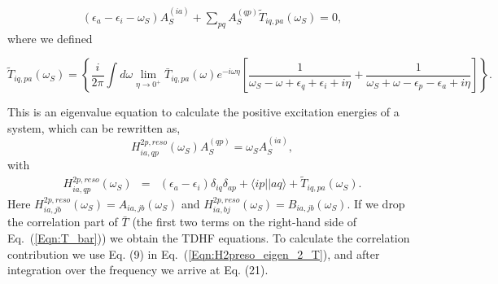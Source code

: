 \documentclass[a4paper,superscriptaddress,twocolumn,aps,prb,floatfix,citeautoscript]{revtex4-1}\usepackage[utf8]{inputenc}
\newcommand{\be}{\begin{equation}}
\newcommand{\ee}{\end{equation}}
\begin{document}
 \begin{eqnarray}
(\epsilon_a-\epsilon_i-\omega_S)A_S^{(ia)}+\sum_{pq}A_S^{(q p)}\widetilde{T}_{iq,pa}(\omega_S)=0,
  \end{eqnarray}
where we defined
\begin{widetext}
\be
\widetilde{T}_{iq,pa}(\omega_S)=\left\{\frac{i}{2\pi}\int d\omega \lim_{\eta\rightarrow 0^+}\bar{T}_{iq,pa}(\omega)e^{-i\omega\eta} \left[\frac{1}{\omega_S-\omega+\epsilon_{q}+\epsilon_i+i\eta}+\frac{1}{\omega_S+\omega-\epsilon_p-\epsilon_a+i\eta}\right]\right\}\nonumber.
 \label{Eqn:H2preso_eigen_2_T}
\ee
\end{widetext}

This is an eigenvalue equation to calculate the positive excitation energies of a system, which can be rewritten as,
  \begin{equation}
 H^{2p,reso}_{ia,qp}(\omega_S)A_S^{(qp)}=\omega_S A^{(ia)}_S,
 \label{Eqn:H2preso_eigen}
 \end{equation}
 with
\begin{eqnarray}
 H^{2p,reso}_{ia,qp}(\omega_S)&=&(\epsilon_a-\epsilon_i)\delta_{iq}\delta_{ap} +\langle ip||aq\rangle+\widetilde{T}_{iq,pa}(\omega_S).
  \end{eqnarray}
  Here  $H^{2p,reso}_{ia,jb}(\omega_S)=A_{ia,jb}(\omega_S)$ and $H^{2p,reso}_{ia,bj}(\omega_S)=B_{ia,jb}(\omega_S)$.
 If we drop the correlation part of $\bar{T}$ (the first two terms on the right-hand side of Eq.~(\ref{Eqn:T_bar})) we obtain the TDHF equations. To calculate the correlation contribution we use Eq. (9) 
 in  Eq.~(\ref{Eqn:H2preso_eigen_2_T}), and after integration over the frequency we arrive at Eq. (21).

%
%
%
%
%
\end{document}
